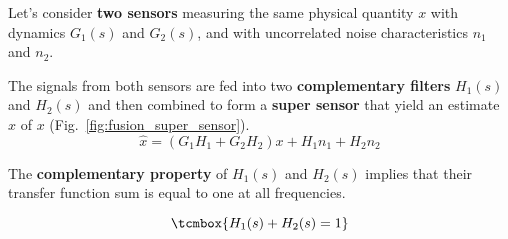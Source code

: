 Let's consider \textbf{two sensors} measuring the same physical quantity \(x\) with
dynamics \(G_1(s)\) and \(G_2(s)\), and with uncorrelated noise characteristics
\(n_1\) and \(n_2\).

\bigskip

The signals from both sensors are fed into two \textbf{complementary filters} \(H_1(s)\)
and \(H_2(s)\) and then combined to form a \textbf{super sensor} that yield an estimate \(\hat{x}\) of \(x\) (Fig.~\ref{fig:fusion_super_sensor}).
\begin{equation*}
  \hat{x} = \left(G_1 H_1 + G_2 H_2\right) x + H_1 n_1 + H_2 n_2
\end{equation*}

\begin{minipage}[t]{0.69\linewidth}
  The \textbf{complementary property} of \(H_1(s)\) and \(H_2(s)\) implies that their transfer function sum is equal to one at all frequencies.
\end{minipage}\hfill
\begin{minipage}[t]{0.29\linewidth}
  \vspace{-2em}
  \begin{equation*}
    \tcmbox{H_1(s) + H_2(s) = 1}
  \end{equation*}
\end{minipage}

